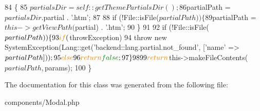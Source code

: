 \begin{DoxyCode}
84     \{   
85         $partialsDir = self::getThemePartialsDir();
86         $partialPath = $partialsDir . $partial . \textcolor{stringliteral}{'.htm'};
87 
88         \textcolor{keywordflow}{if} (!File::isFile($partialPath)) \{
89             $partialPath = $this->getViewPath($partial) . \textcolor{stringliteral}{'.htm'};
90         \}
91 
92         \textcolor{keywordflow}{if} (!File::isFile($partialPath)) \{
93             \textcolor{keywordflow}{if} ($throwException)
94                 \textcolor{keywordflow}{throw} \textcolor{keyword}{new} SystemException(Lang::get(\textcolor{stringliteral}{'backend::lang.partial.not\_found'}, [\textcolor{stringliteral}{'name'} => 
      $partialPath]));
95             \textcolor{keywordflow}{else}
96                 \textcolor{keywordflow}{return} \textcolor{keyword}{false};
97         \}   
98 
99         \textcolor{keywordflow}{return} $this->makeFileContents($partialPath, $params);
100     \}   
\end{DoxyCode}


The documentation for this class was generated from the following file\+:\begin{DoxyCompactItemize}
\item 
components/Modal.\+php\end{DoxyCompactItemize}
